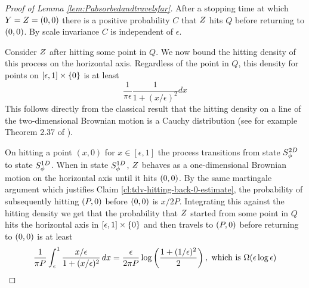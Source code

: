 {\begin{proof}[Proof of Lemma \ref{lem:Pabsorbedandtravelsfar}]
After a stopping time at which $Y = Z = (0,0)$ there is a positive probability $C$
that $Z$ hits $Q$ before returning to $(0,0)$.
By scale invariance $C$ is independent of $\epsilon$.

Consider $Z$ after hitting some point in $Q$.  We now
bound the hitting density of this process on the horizontal
axis.  Regardless of the point in $Q$, this density for points on
$[\epsilon,1] \times \{0\}$ is at least
\[
\frac{1}{\pi\epsilon} \frac{1}{1 + (x/\epsilon)^2} dx
\]
This follows directly from the classical result that the hitting density
on a line of the two-dimensional Brownian motion is a Cauchy distribution
(see for example Theorem 2.37 of \cite{mortens-peres}).

On hitting a point $(x,0)$ for $x \in [\epsilon, 1]$ the process
transitions from state $S^{2D}_{\phi}$ to state $S^{1D}_{\phi}$.
When in state $S^{1D}_{\phi}$, $Z$ behaves as a
one-dimensional Brownian motion on the horizontal axis until it hits
$(0,0)$.
By the same martingale argument which justifies
Claim \ref{cl:tdv-hitting-back-0-estimate}, the
probability of subsequently hitting $(P,0)$ before $(0,0)$ is $x/2P$.
Integrating this against the hitting density we get that the probability that
$Z$ started from some point in $Q$ hits the horizontal axis in $[\epsilon,1] \times \{0\}$
and then travels to $(P,0)$ before returning
to $(0,0)$ is at least
\[
\frac{1}{\pi P} \int_{\epsilon}^{1} \frac{x/\epsilon}{1 + (x/\epsilon)^2}
\, dx
=
\frac{\epsilon}{2\pi P} \log\left(\frac{1 + (1/\epsilon)^2}{2}\right)
,\text{ which is }
\Omega(\epsilon\log\epsilon)
\]
\end{proof}
}
